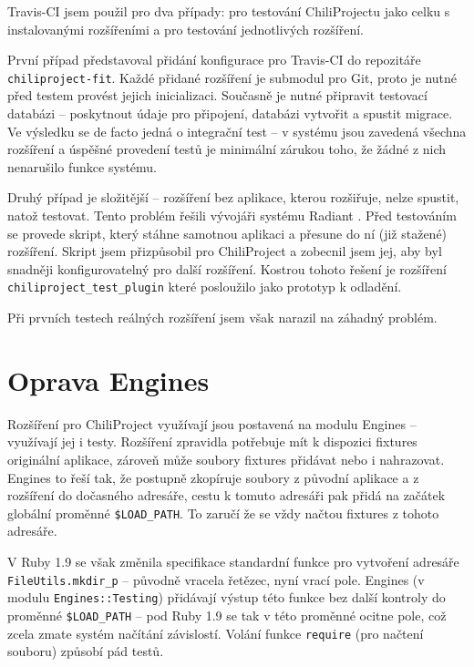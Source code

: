 \documentclass[thesis=B,czech]{FITthesis}[2012/05/02]
\begin{document}
Travis-CI jsem použil pro dva případy: pro testování ChiliProjectu jako
celku s instalovanými rozšířeními a pro testování jednotlivých
rozšíření.

První případ představoval přidání konfigurace pro Travis-CI do
repozitáře \lstinline!chiliproject-fit!. Každé přidané rozšíření je
\gls{submodul} pro Git, proto je nutné před testem provést jejich
inicializaci. Současně je nutné připravit testovací databázi --
poskytnout údaje pro připojení, databázi vytvořit a spustit migrace. Ve
výsledku se de facto jedná o integrační test -- v systému jsou zavedená
všechna rozšíření a úspěšné provedení testů je minimální zárukou toho,
že žádné z nich nenarušilo funkce systému.

Druhý případ je složitější -- rozšíření bez aplikace, kterou rozšiřuje,
nelze spustit, natož testovat. Tento problém řešili vývojáři systému
Radiant \citep{Muhl2012}. Před testováním se provede skript, který
stáhne samotnou aplikaci a přesune do ní (již stažené) rozšíření. Skript
jsem přizpůsobil pro ChiliProject a zobecnil jsem jej, aby byl snadněji
konfigurovatelný pro další rozšíření. Kostrou tohoto řešení je rozšíření
\lstinline!chiliproject_test_plugin! které posloužilo jako prototyp k
odladění.

Při prvních testech reálných rozšíření jsem však narazil na záhadný
problém.

\section{Oprava Engines}
\label{oprava-engines}

Rozšíření pro ChiliProject využívají jsou postavená na modulu Engines --
využívají jej i testy. Rozšíření zpravidla potřebuje mít k dispozici
\gls{fixtures} originální aplikace, zároveň může soubory fixtures
přidávat nebo i nahrazovat. Engines to řeší tak, že postupně zkopíruje
soubory z původní aplikace a z rozšíření do dočasného adresáře, cestu k
tomuto adresáři pak přidá na začátek globální proměnné
\lstinline!$LOAD_PATH!. To zaručí že se vždy načtou fixtures z tohoto
adresáře.

V Ruby 1.9 se však změnila specifikace standardní funkce pro vytvoření
adresáře \lstinline!FileUtils.mkdir_p! -- původně vracela řetězec, nyní
vrací pole. Engines (v modulu \lstinline!Engines::Testing!) přidávají
výstup této funkce bez další kontroly do proměnné \lstinline!$LOAD_PATH!
-- pod Ruby 1.9 se tak v této proměnné ocitne pole, což zcela zmate
systém načítání závislostí. Volání funkce \lstinline!require! (pro
načtení souboru) způsobí pád testů.
\end{document}
